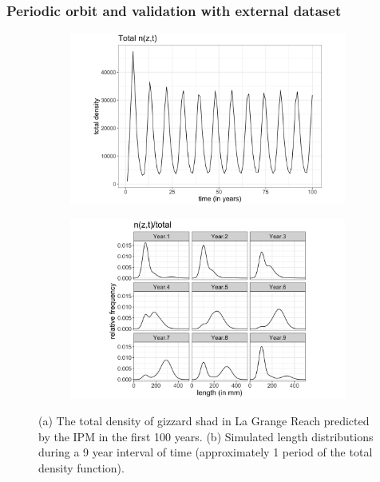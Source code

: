 \documentclass[preprint,review,12pt,authoryear]{elsarticle}
\begin{document}
\subsubsection{Periodic orbit and validation with external dataset}
\begin{figure}
\centering
\begin{subfigure}[b]{.45\textwidth}
  \includegraphics[width=\textwidth]{figures/ntotal.png}
   \caption{}
  \label{fig:ntotal}
\end{subfigure}
\begin{subfigure}[b]{.45\textwidth}
 \includegraphics[width=\textwidth]{figures/period_facet.png}
     \caption{}
\label{fig:period}
\end{subfigure}
\caption{(a) The total density of gizzard shad in La Grange Reach predicted by the IPM in the first 100 years. 
(b) Simulated length distributions during a 9 year interval of time (approximately 1 period of the total density function).}
\end{figure}    
\end{document}
